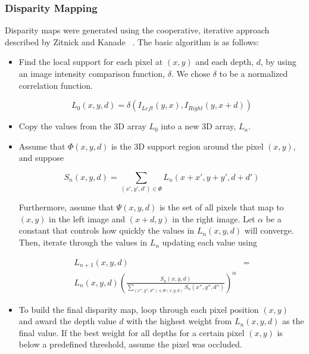 \documentclass[a4paper,twoside]{article}
\begin{document}
\subsubsection{Disparity Mapping}
\label{subsec:disparity_mapping}

Disparity maps were generated using the cooperative, iterative approach described by Zitnick and Kanade ~\cite{stereo:zitKan}.
The basic algorithm is as follows:
\begin{itemize}
\item Find the local support for each pixel at $(x,y)$ and each depth, $d$, by using an image intensity comparison function, $\delta$.
We chose $\delta$ to be a normalized correlation function.

\begin{equation}
L_0(x,y,d) = \delta(I_{Left}(y,x),I_{Right}(y,x+d))
\end{equation}

\item Copy the values from the 3D array $L_0$ into a new 3D array, $L_n$.

\item Assume that $\Phi(x,y,d)$ is the 3D support region around the pixel $(x,y)$, and suppose

\begin{equation}
S_n(x,y,d) = \sum_{(x',y',d') \in \Phi} L_n (x+x', y+y', d+d')
\end{equation}

Furthermore, assume that $\Psi(x,y,d)$ is the set of all pixels that map to $(x,y)$ in the left image and $(x+d,y)$ in the right image. 
Let $\alpha$ be a constant that controls how quickly the values in $L_n(x,y,d)$ will converge. Then, iterate through the values in $L_n$ updating each value using
 
\begin{align}
L_{n+1}(x,y,d) &= \\ 
L_n(x,y,d)\left(\frac{S_n(x,y,d)}{\sum\limits_{(x'',y'',d'') \in \Psi(x,y,d)} S_n(x'',y'',d'')} \right)^\alpha 
\end{align}

\item To build the final disparity map, loop through each pixel position $(x,y)$ and award the depth value $d$ with the highest weight from $L_n(x,y,d)$ as the final value.
If the best weight for all depths for a certain pixel $(x,y)$ is below a predefined threshold, assume the pixel was occluded.
\end{itemize}
\end{document}
